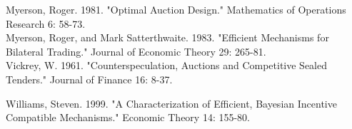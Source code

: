 \documentclass[10pt]{article}
\begin{document}
Myerson, Roger. 1981. "Optimal Auction Design." Mathematics of Operations Research 6: 58-73.\\
Myerson, Roger, and Mark Satterthwaite. 1983. "Efficient Mechanisms for Bilateral Trading." Journal of Economic Theory 29: 265-81.\\
Vickrey, W. 1961. "Counterspeculation, Auctions and Competitive Sealed Tenders." Journal of Finance 16: 8-37.

Williams, Steven. 1999. "A Characterization of Efficient, Bayesian Incentive Compatible Mechanisms." Economic Theory 14: 155-80.
\end{document}
